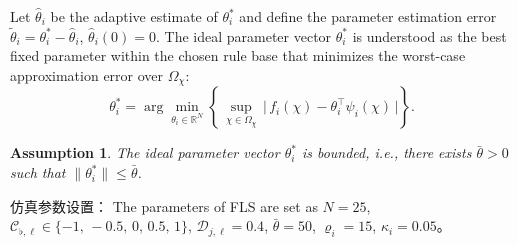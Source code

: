 \documentclass[pdflatex,sn-mathphys-num]{sn-jnl}%
\theoremstyle{thmstyleone}%
\newtheorem{assumption}{Assumption}
\theoremstyle{thmstyletwo}%
\theoremstyle{thmstylethree}%
\begin{document}
\par Let $\hat\theta_i$ be the adaptive estimate of $\theta_i^*$ and define the parameter estimation error $\tilde\theta_i=\theta_i^*-\hat\theta_i$, $\hat\theta_i(0)= 0$. The ideal parameter vector $\theta_i^*$ is understood as the best fixed parameter within the chosen rule base that minimizes the worst-case approximation error over $\Omega_\chi$:
\begin{equation}
    \theta_i^* = \arg\min_{\theta_i\in\mathbb{R}^N}
    \left\{\,\sup_{\chi\in\Omega_\chi}\, \big|\, f_i(\chi)-\theta_i^\top \psi_i(\chi)\,\big| \right\}.
    \label{eq:6}
\end{equation}

\begin{assumption}\label{assumption:3}
The ideal parameter vector $\theta_i^*$ is bounded, i.e., there exists $\bar\theta>0$ such that $\|\theta_i^*\|\le \bar\theta$.
\end{assumption}


仿真参数设置：
The parameters of FLS are set as $N=25$, $\mathcal C_{\flat,\ell}\in\{-1,\,-0.5,\,0,\,0.5,\,1\}$, $\mathcal D_{j,\ell}=0.4$, $\bar\theta=50$, $\varrho_i=15$, $\kappa_i=0.05$。




\end{document}
